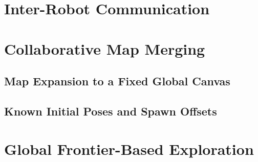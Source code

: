 \section{Inter-Robot Communication}
\label{sec:inter_robot_comms}

\section{Collaborative Map Merging}
\label{sec:collaborative_map_merge}

\subsection{Map Expansion to a Fixed Global Canvas}
\label{subsec:map_expansion}

\subsection{Known Initial Poses and Spawn Offsets}
\label{subsec:spawn_offsets}

\section{Global Frontier-Based Exploration}
\label{sec:global_frontiers}

